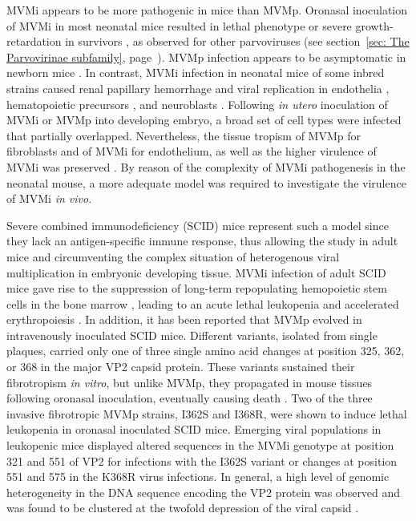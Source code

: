 MVMi appears to be more pathogenic in mice than MVMp. Oronasal inoculation of MVMi in most neonatal mice resulted in lethal phenotype or severe growth-retardation in survivors \cite{pmid3712557}, as observed for other parvoviruses (see section~\ref{sec: The Parvovirinae subfamily}, page~\pageref{sec: The Parvovirinae subfamily}). MVMp infection appears to be asymptomatic in newborn mice \cite{pmid1373202}. In contrast, MVMi infection in neonatal mice of some inbred strains caused renal papillary hemorrhage and viral replication in endothelia \cite{pmid1653878}, hematopoietic precursors \cite{pmid7707557}, and neuroblasts \cite{pmid8892936}. Following \textit{in utero} inoculation of MVMi or MVMp into developing embryo, a broad set of cell types were infected that partially overlapped. Nevertheless, the tissue tropism of MVMp for fibroblasts and of MVMi for endothelium, as well as the higher virulence of MVMi was preserved \cite{pmid15308740}. 
By reason of the complexity of MVMi pathogenesis in the neonatal mouse, a more adequate model was required to investigate the virulence of MVMi \textit{in vivo}. 

Severe combined immunodeficiency (SCID) mice \cite{pmid6823332} represent such a model since they lack an antigen-specific immune response, thus allowing the study in adult mice and circumventing the complex situation of heterogenous viral multiplication in embryonic developing tissue. MVMi infection of adult SCID mice gave rise to the suppression of long-term repopulating hemopoietic stem cells in the bone marrow \cite{pmid12857918}, leading to an acute lethal leukopenia and accelerated erythropoiesis \cite{pmid9971754}.
In addition, it has been reported that MVMp evolved in intravenously inoculated SCID mice. Different variants, isolated from single plaques, carried only one of three single amino acid changes at position 325, 362, or 368 in the major VP2 capsid protein. These variants sustained their fibrotropism \textit{in vitro}, but unlike MVMp, they propagated in mouse tissues following oronasal inoculation, eventually causing death \cite{pmid16415031, pmid16103180}.
Two of the three invasive fibrotropic MVMp strains, I362S and I368R, were shown to induce lethal leukopenia in oronasal inoculated SCID mice. Emerging viral populations in leukopenic mice displayed altered sequences in the MVMi genotype at position 321 and 551 of VP2 for infections with the I362S variant or changes at position 551 and 575 in the K368R virus infections. In general, a high level of genomic heterogeneity in the DNA sequence encoding the VP2 protein was observed and was found to be clustered at the twofold depression of the viral capsid \cite{pmid18045943}.            	
	
